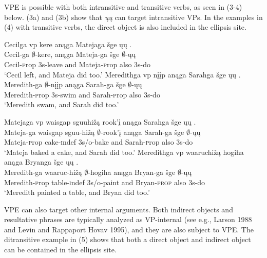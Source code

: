 \documentclass[output=paper]{LSP/langsci}
\begin{document}
VPE is possible with both intransitive and transitive verbs, as seen in (3-4) below. (3a) and (3b) show that \emph{ųų} can target intransitive VPs. In the examples in (4) with transitive verbs, the direct object is also included in the ellipsis site.

\begin{exe}
\ex
\begin{xlist}
\ex
\glll Cecilga {\ob}{vp} kere{\cb} anąga Matejaga šge {\ob}ųų{\cb} .\\
Cecil-ga {} $\emptyset$-kere, anąga Mateja-ga šge $\emptyset$-ųų\\
Cecil-{\textsc prop} {} {\textsc 3s}-leave and Mateja-{\textsc prop} also {\textsc 3s}-do\\
\trans `Cecil left, and Mateja did too.'
\ex
\glll Meredithga {\ob}{vp} nįįp{\cb} anąga Sarahga šge {\ob}ųų{\cb} .\\
Meredith-ga {} $\emptyset$-nįįp anąga Sarah-ga šge $\emptyset$-ųų\\
Meredith-{\textsc prop} {} {\textsc 3s}-swim and Sarah-{\textsc prop} also {\textsc 3s}-do\\
\trans `Meredith swam, and Sarah did too.'
\end{xlist}
\end{exe}

\begin{exe}
\ex
\begin{xlist}
\ex
\glll Matejaga {\ob}{vp} {waisgap sguuhižą} rook'į{\cb} anąga Sarahga šge {\ob}ųų{\cb} .\\
Mateja-ga {} {waisgap sguu-hižą} $\emptyset$-rook'į anąga Sarah-ga šge $\emptyset$-ųų\\
Mateja-{\textsc prop} {} cake-{\textsc indef} {\textsc 3s/o}-bake and Sarah-{\textsc prop} also {\textsc 3s}-do\\
\trans `Mateja baked a cake, and Sarah did too.'
\ex
\glll Meredithga {\ob}{vp} waaruchižą hogiha{\cb} anąga Bryanga šge {\ob}ųų{\cb} .\\
Meredith-ga {} waaruc-hižą $\emptyset$-hogiha anąga Bryan-ga šge $\emptyset$-ųų\\
Meredith-{\textsc prop} {} table-{\textsc indef} {\textsc 3s/o}-paint and Bryan-\textsc{prop} also {\textsc 3s}-do\\
\trans `Meredith painted a table, and Bryan did too.'
\end{xlist}
\end{exe}

VPE can also target other internal arguments. Both indirect objects and resultative phrases are typically analyzed as VP-internal (see e.g., Larson 1988 and Levin and Rappaport Hovav 1995), and they are also subject to VPE. The ditransitive example in (5) shows that both a direct object and indirect object can be contained in the ellipsis site.
\end{document}
